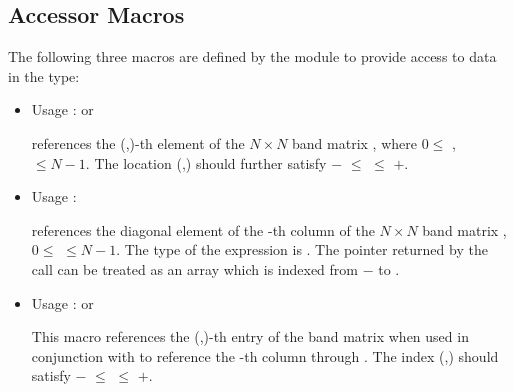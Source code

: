 \subsection{Accessor Macros}
The following three macros are defined by the {\band} module to provide
access to data in the  type:
\begin{itemize}
\item {}
  \par Usage :  or 
  \par {} references the (,)-th element of the
  $N \times N$ band matrix , where $0 \le$ ,  $\le N-1$.
  The location (,) should further satisfy 
  $-$ $\le$  $\le$ $+$.
\item {}
  \par Usage : 
  \par {} references the diagonal element of the -th
  column of the $N \times N$ band matrix , $0 \le$  $\le N-1$.
  The type of the expression  is . 
  The pointer returned by the call  can be treated as 
  an array which is indexed from $-$ to .
\item {}
  \par Usage :  or
  \par This macro references the (,)-th entry of the band matrix 
  when used in conjunction with  to reference the -th column through
  . The index (,) should satisfy 
  $-$ $\le$  $\le$ $+$.
\end{itemize}

